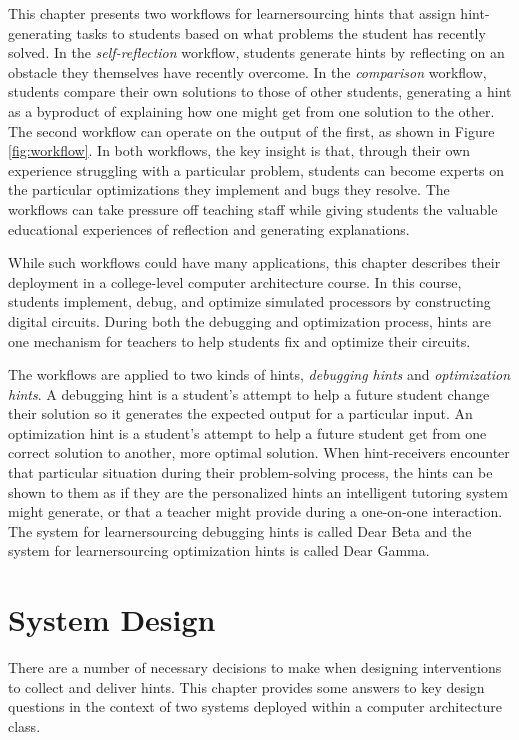 This chapter presents two workflows for learnersourcing hints that assign hint-generating tasks to students based on what problems the student has recently solved. In the \textit{self-reflection} workflow, students generate hints by reflecting on an obstacle they themselves have recently overcome. In the \textit{comparison} workflow, students compare their own solutions to those of other students, generating a hint as a byproduct of explaining how one might get from one solution to the other. The second workflow can operate on the output of the first, as shown in Figure \ref{fig:workflow}. In both workflows, the key insight is that, through their own experience struggling with a particular problem, students can become experts on the particular optimizations they implement and bugs they resolve. The workflows can take pressure off teaching staff while giving students the valuable educational experiences of reflection and generating explanations. 

While such workflows could have many applications, this chapter describes their deployment in a college-level computer architecture course. In this course, students implement, debug, and optimize simulated processors by constructing digital circuits. During both the debugging and optimization process, hints are one mechanism for teachers to help students fix and optimize their circuits. 

The workflows are applied to two kinds of hints, \textit{debugging hints} and \textit{optimization hints}. A debugging hint is a student's attempt to help a future student change their solution so it generates the expected output for a particular input. An optimization hint is a student's attempt to help a future student get from one correct solution to another, more optimal solution. When hint-receivers encounter that particular situation during their problem-solving process, the hints can be shown to them as if they are the personalized hints an intelligent tutoring system might generate, or that a teacher might provide during a one-on-one interaction. The system for learnersourcing debugging hints is called Dear Beta and the system for learnersourcing optimization hints is called Dear Gamma.

\section{System Design}
There are a number of necessary decisions to make when designing interventions to collect and deliver hints. This chapter provides some answers to key design questions in the context of two systems deployed within a computer architecture class.%

